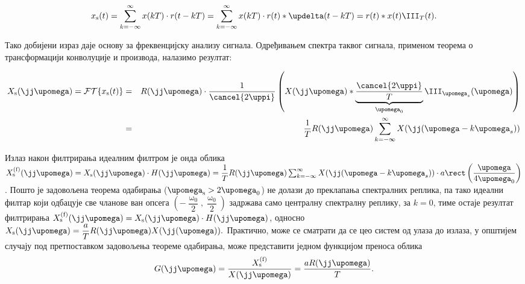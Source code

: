 \begin{equation}
x_{\rm s}(t) = \sum_{k = -\infty}^{\infty} x(kT) \cdot r(t - kT)    
             = \sum_{k = -\infty}^{\infty} x(kT) \cdot r(t) \ast \updelta(t - kT) = 
             r(t) \ast x(t) \III_T(t).  
\end{equation}

Тако добијени израз даје основу за фреквенцијску анализу сигнала. Одређивањем спектра 
таквог сигнала, применом теорема о трансформацији конволуције и производа, налазимо резултат:

\begin{eqnarray}
    X_{\rm s}(\jj\upomega) = \mathcal{FT}\{ x_{\rm s}(t) \}
    &=& R(\jj\upomega) \cdot \dfrac{1}{\cancel{2\uppi}} 
    \left(X(\jj\upomega) \ast 
    \underbrace{\dfrac{\cancel{2\uppi}}{T}}_{\upomega_0} \III_{\upomega_s}(\upomega) \right)
    \\
    &=&
    \dfrac{1}{T}
    R(\jj\upomega) \sum_{k = -\infty}^{\infty} X(\jj(\upomega - k\upomega_s)) \nonumber \\
\end{eqnarray}

Излаз након филтрирања идеалним филтром је онда облика 
$X_{\rm s}^{\text{(f)}}(\jj\upomega) = 
X_{\rm s}(\jj\upomega)\cdot H(\jj\upomega) = \dfrac{1}{T} R(\jj\upomega)
\sum_{k = -\infty}^{\infty} X(\jj(\upomega - k\upomega_s)) 
\cdot a \rect\left(\dfrac{\upomega}{4\upomega_0} \right)$. Пошто је задовољена 
теорема одабирања ($\upomega_{\rm s} > 2\upomega_{0}$) не долази до преклапања спектралних реплика, 
па тако идеални филтар који одбацује све чланове ван опсега 
$\left(-\dfrac{\upomega_0}{2}, \dfrac{\upomega_0}{2}\right)$ задржава само централну 
спектралну реплику, за $k = 0$, тиме остаје резултат филтрирања
$X_{\rm s}^{\text{(f)}}(\jj\upomega) = 
X_{\rm s}(\jj\upomega)\cdot H(\jj\upomega)$, односно 
$
    X_{\rm s}(\jj\upomega) = \dfrac{a}{T} R(\jj\upomega)  X(\jj(\upomega)).
$
Практично, може се сматрати да се цео систем од улаза до излаза, у општијем случају 
под претпоставком задовољења теореме одабирања, може представити једном функцијом преноса 
облика 
\begin{equation}
    G(\jj\upomega) = \dfrac{X_{\rm s}^{\text{(f)}}}{X(\jj\upomega)} = \dfrac{a R(\jj\upomega)}{T}. \label{eq:\ID.general}
\end{equation}


